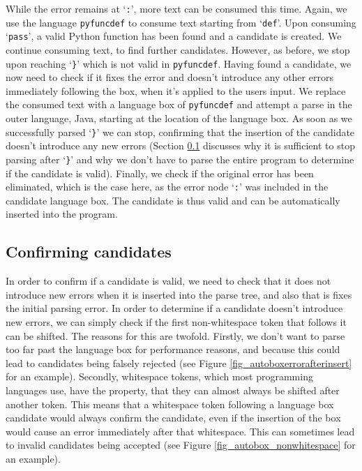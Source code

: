\documentclass[sigplan,screen]{acmart}\settopmatter{printfolios=true,printccs=false,printacmref=false}
\newcommand{\qtt}[1]{`\texttt{#1}'\xspace}
\begin{document}
While the error remains at \qtt{:}, more text can be consumed this time. Again,
we use the language \texttt{pyfuncdef} to consume text starting from \qtt{def}.
Upon consuming \qtt{pass}, a valid Python function has been found and a
candidate is created. We continue consuming text, to find further candidates.
However, as before, we stop upon reaching \qtt{\}} which is not valid in
\texttt{pyfuncdef}. Having found a candidate, we now need to check if it fixes
the error and doesn't introduce any other errors immediately following the box,
when it's applied to the users input. We replace the consumed text with a
language box of \texttt{pyfuncdef} and attempt a parse in the outer language,
Java, starting at the location of the language box.
As soon as we successfully parsed \qtt{\}} we can stop,
confirming that the insertion of the candidate doesn't introduce
any new errors (Section \ref{sec:parse_after_lbox} discusses why it is
sufficient to stop parsing after \qtt{\}} and why we don't have to parse the
entire program to determine if the candidate is valid). Finally, we check if
the original error has been eliminated, which is the case here, as the error
node \qtt{:} was included in the candidate language box. The candidate is thus
valid and can be automatically inserted into the program.

\subsection{Confirming candidates}
\label{sec:parse_after_lbox}

In order to confirm if a candidate is valid, we need to
check that it does not introduce new errors when it is inserted into the parse
tree, and also that is fixes the initial parsing error. In order to determine if a
candidate doesn't introduce new errors, we can simply check if the first
non-whitespace token that follows it can be shifted.  The reasons for this are
twofold. Firstly, we don't want to parse too far past the language box for
performance reasons, and because this could lead to candidates being falsely
rejected (see Figure \ref{fig_autoboxerrorafterinsert} for an example).
Secondly, whitespace tokens, which most programming languages use, have the
property, that they can almost always be shifted after another token. This
means that a whitespace token following a language box candidate would always
confirm the candidate, even if the insertion of the box would cause an error
immediately after that whitespace. This can sometimes lead to invalid
candidates being accepted (see Figure \ref{fig_autobox_nonwhitespace} for an
example).
\end{document}
